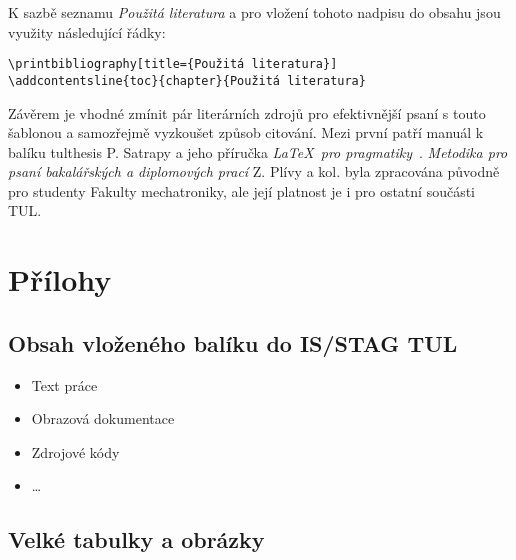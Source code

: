 \documentclass[FM,SP]{tulthesis}
\newcommand{\argument}[1]{{\ttfamily\color{\tulcolor}#1}}
\newenvironment{myquote}{\begin{list}{}{\setlength\leftmargin\parindent}\item[]}{\end{list}}
\newenvironment{listing}{\begin{myquote}\color{\tulcolor}}{\end{myquote}}
\begin{document}
K sazbě seznamu \textit{Použitá literatura} a pro vložení tohoto nadpisu do obsahu jsou využity následující řádky:
\begin{listing}
\begin{verbatim}
\printbibliography[title={Použitá literatura}] 
\addcontentsline{toc}{chapter}{Použitá literatura}     
\end{verbatim}
\end{listing}

Závěrem je vhodné zmínit pár literárních zdrojů pro efektivnější psaní s touto šablonou a samozřejmě vyzkoušet způsob citování. Mezi první patří manuál k balíku \argument{tulthesis} P. Satrapy \cite{Satrapa2022tulthesis} a jeho příručka \textit{\LaTeX\  pro pragmatiky}~\cite{Satrapa2011LatexPragmatiky}. \textit{Metodika pro psaní bakalářských a diplomových prací} Z. Plívy a kol. \cite{Pliva2019DOKcz} byla zpracována původně pro studenty Fakulty mechatroniky, ale její platnost je i pro ostatní součásti TUL. 

\nocite{*}

\printbibliography[title={Použitá literatura}] %


\renewcommand{\indexname}{Přehled příkazů, prostředí a voleb}
\printindex

\appendix %
\chapter{Přílohy}
\section{Obsah vloženého balíku do IS/STAG TUL} %
\begin{itemize}
    \item Text práce
    \item Obrazová dokumentace
    \item Zdrojové kódy
    \item \dots
\end{itemize}

\section{Velké tabulky a obrázky} %
\end{document}
